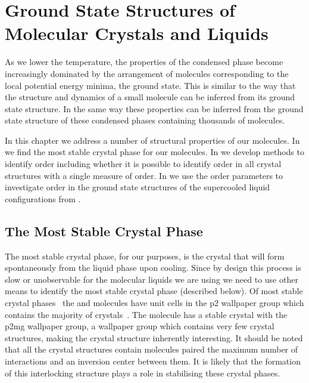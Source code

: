 \chapter[Strucuture of Crystals and Liquids]{Ground State Structures of Molecular Crystals and Liquids}
\label{sec:structure}

As we lower the temperature, the properties of the condensed phase become increasingly dominated by the arrangement of molecules corresponding to the local potential energy minima, the ground state. This is similar to the way that the structure and dynamics of a small molecule can be inferred from its ground state structure. In the same way these properties can be inferred from the ground state structure of these condensed phases containing thousands of molecules.

In this chapter we address a number of structural properties of our molecules. In  we find the most stable crystal phase for our molecules. In  we develop methods to identify order including whether it is possible to identify order in all crystal structures with a single measure of order. In  we use the order parameters to investigate order in the ground state structures of the supercooled liquid configurations from .

\section{The Most Stable Crystal Phase}
\label{sec:crys phase}

The most stable crystal phase, for our purposes, is the crystal that will form spontaneously from the liquid phase upon cooling. Since by design this process is slow or unobservable for the molecular liquids we are using we need to use other means to identify the most stable crystal phase (described below). Of most stable crystal phases~ the \dcon and \tri molecules have unit cells in the p2 wallpaper group  which contains the majority of crystals~\cite{plass:07,jennings:15}. The \done molecule has a stable crystal with the p2mg wallpaper group, a wallpaper group which contains very few crystal structures, making the crystal structure inherently interesting. It should be noted that all the crystal structures contain molecules paired the maximum number of interactions and an inversion center between them. It is likely that the formation of this interlocking structure plays a role in stabilising these crystal phases.


